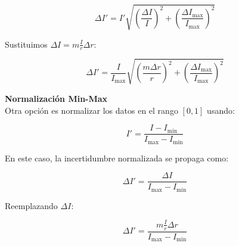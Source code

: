 \documentclass{article}
\theoremstyle{nonumberplain}
\begin{document}
\[
\Delta I' = I' \sqrt{\left(\frac{\Delta I}{I}\right)^2 + \left(\frac{\Delta I_{\max}}{I_{\max}}\right)^2}
\]

Sustituimos \( \Delta I = m \frac{I}{r} \Delta r \):

\[
\Delta I' = \frac{I}{I_{\max}} \sqrt{\left( \frac{m \Delta r}{r} \right)^2 + \left(\frac{\Delta I_{\max}}{I_{\max}}\right)^2}
\]

\newpage

\textbf{Normalización Min-Max}\\
Otra opción es normalizar los datos en el rango \([0,1]\) usando:

\[
I' = \frac{I - I_{\min}}{I_{\max} - I_{\min}}
\]

En este caso, la incertidumbre normalizada se propaga como:

\[
\Delta I' = \frac{\Delta I}{I_{\max} - I_{\min}}
\]

Reemplazando \( \Delta I \):

\[
\Delta I' = \frac{m \frac{I}{r} \Delta r}{I_{\max} - I_{\min}}
\]
\end{document}
